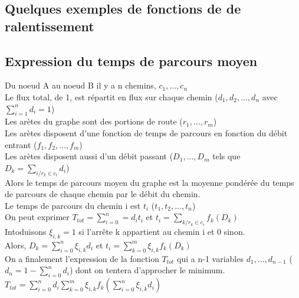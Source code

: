 \documentclass{article}
\newcommand {\axes}[4] {\draw[->] (0,0) -- (#3,0) node [right]{#1};
                        \draw[->] (0,0) -- (0,#4) node[above]{#2};}
\newcommand {\valx}[2] {\draw (#1,0.03) -- (#1,-0.03) node[anchor=north]{#2};}
\newcommand {\valy}[2] {\draw (0.03,#1) -- (-0.03,#1) node[anchor=east]{#2};}
\begin{document}
\subsection{Quelques exemples de fonctions de de ralentissement}


\newpage

\newpage
\subsection{Expression du temps de parcours moyen}
Du noeud A au noeud B il y a n chemins, $c_1,...,c_n$\\
Le flux total, de 1, est répartit en flux sur chaque chemin ($d_1,d_2,...,d_n$
avec $\sum_{i=1}^n d_i=1$)\\
Les arètes du graphe sont des portions de route ($r_1,...,r_m$)\\
Les arètes disposent d'une fonction de temps de parcours en fonction du débit
entrant ($f_1,f_2,...,f_m$)\\
Les arètes disposent aussi d'un débit passant ($D_1,...,D_m$ tels que
$D_k = \sum_{i / r_k\in c_i} d_i$)\\
Alors le temps de parcours moyen du graphe est la moyenne pondérée du temps de
parcours de chaque chemin par le débit du chemin.\\
Le temps de parcours du chemin i est $t_i$ ($t_1,t_2,...,t_n$)\\
On peut exprimer $T_{tot}=\sum_{i=0}^n = d_i t_i$ et
$t_i = \sum_{k/r_k\in c_i} f_k(D_k)$ \\
Intoduisons $\xi_{i,k} = 1$ si l'arrête k appartient au chemin i et 0 sinon.\\
Alors, $D_k = \sum_{i=0}^n \xi_{i,k} d_i$ et
$t_i = \sum_{k=0}^m \xi_{i,k} f_k(D_k)$\\
On a finalement l'expression de la fonction $T_{tot}$ qui a n-1 variables
$d_1,...,d_{n-1}$ ($d_n = 1-\sum_{i=0}^n d_i$)
dont on tentera d'approcher le minimum.\\
$T_{tot}=\sum_{i=0}^n d_i \sum_{k=0}^m \xi_{i,k} f_k(\sum_{i=0}^n \xi_{i,k} d_i)$\\
\end{document}
